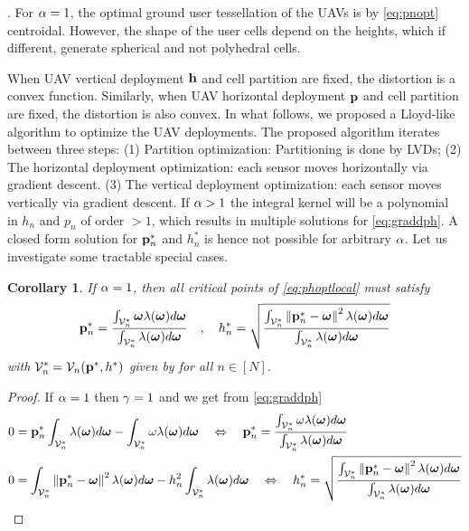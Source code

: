 \documentclass[smallabstract,smallcaptions]{dccpaper}
\newenvironment{remark}{\par\vspace{1.5ex}\noindent{\em Remark\/}.}{\par\vspace{1.5ex}}
\newcommand{\df}{\ensuremath{\lam}}         %
\newcommand{\bP}{\ensuremath{\vp}}          %
\newcommand{\bH}{\ensuremath{\vh}}          %
\newcommand{\Vor}{\ensuremath{\mathcal{V}}}         %
\newtheorem{corollary}{Corollary}
\begin{document}
%
\fi
\begin{remark}
  For $\alpha=1$, the optimal ground user tessellation of the UAVs is by \eqref{eq:pnopt} centroidal. However, the shape of
  the user cells depend on the heights, which if different, generate spherical and not polyhedral cells. 
\end{remark}

When UAV vertical deployment $\bH$ and cell partition are fixed, the distortion is a convex function.  Similarly, when
UAV horizontal deployment $\bP$ and cell partition are fixed, the distortion is also convex.  In what follows,
we proposed a Lloyd-like algorithm to optimize the UAV deployments.  The proposed algorithm iterates between three
steps: (1) Partition optimization: Partitioning is done by LVDs; (2) The horizontal deployment optimization: each sensor
moves horizontally via gradient descent.  (3) The vertical deployment optimization: each sensor moves vertically via
gradient descent.
\fi %
If $\alpha>1$ the integral kernel will be a polynomial in $h_n$ and $p_n$ of order $>1$, which results in multiple
solutions for \eqref{eq:graddph}. A closed form solution for ${\mathbf p}_n^*$ and $h_n^*$ is hence not possible for arbitrary
$\alpha$. Let us investigate some tractable special cases.   
%
\begin{corollary}\label{cor:alponedifheight}
  If $\alpha=1$, then all critical points  of \eqref{eq:phoptlocal} must satisfy 
  \begin{align}
    \vp_n^* = \frac{\int_{\Vor^*_n} \vome \df(\vome)d\vome}{\int_{\Vor^*_n} \df(\vome)d\vome}\quad,\quad 
    h_n^* = \sqrt{\frac{\int_{\Vor^*_n}\Norm{\vp_n^*-\vome}^2 \df(\vome)d\vome}{\int_{\Vor^*_n} \df(\vome)d\vome}}\label{eq:pnhn}
  \end{align}
  with  $\Vor_n^*=\Vor_n(\vp^*,h^*)$ given by  for all $n\in[N]$.
\end{corollary}
%
\begin{proof}
  If $\alpha=1$ then $\gamma=1$ and we get from \eqref{eq:graddph}
  \begin{align}
    &0= \vp_n^*\int_{\Vor^*_n} \df(\vome)d\vome- \int_{\Vor_n^*} \ome\df(\vome)d\vome
   \quad \LRA\quad 
    \vp_n^*= \frac{\int_{\Vor_n^*} \ome\df(\vome)d\vome}{\int_{\Vor^*_n} \df(\vome)d\vome }\\
    &0= \int_{\Vor_n^*} \Norm{\vp_n^*-\vome}^2 \df(\vome) d\vome - h_n^2\int_{\Vor^*_n}  \df(\vome)d \vome
   \quad \LRA \quad
    h_n^*= \sqrt{\frac{\int_{\Vor_n^*} \Norm{\vp_n^*-\vome}^2\df(\vome)d\vome}{\int_{\Vor^*_n}  \df(\vome)d\vome }}
  \end{align}
\end{proof}
\fi %
%
\end{document}
